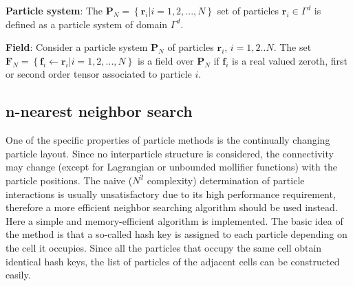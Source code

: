 \documentclass[a4paper,12pt,openany]{book}
\theoremstyle{break}
\begin{document}
\textbf{Particle system}: The $\textbf{P}_{N}=\left\{\textbf{r}_i|i=1,2,...,N\right\}$ set of particles $\textbf{r}_i\in\Gamma^d$ is defined as a particle system of domain $\Gamma^d$.

\textbf{Field}: Consider a particle system $\textbf{P}_N$ of particles $\textbf{r}_i$, $i=1,2..N$. The set $\textbf{F}_N=\left\{\textbf{f}_i\leftarrow \textbf{r}_i \vert i=1,2,...,N\right\}$ is a field over $\textbf{P}_N$ if $\textbf{f}_i$ is a real valued zeroth, first or second order tensor associated to particle $i$.

\subsection{n-nearest neighbor search} \label{sec:neighbor_search}
One of the specific properties of particle methods is the continually changing particle layout. Since no interparticle structure is considered, the connectivity may change (except for Lagrangian or unbounded mollifier functions) with the particle positions. The naive ($N^2$ complexity) determination of particle interactions is usually unsatisfactory due to its high performance requirement, therefore a more efficient neighbor searching algorithm should be used instead. Here a simple and memory-efficient algorithm is implemented. The basic idea of the method is that a so-called hash key is assigned to each particle depending on the cell it occupies. Since all the particles that occupy the same cell obtain identical hash keys, the list of particles of the adjacent cells can be constructed easily.
\end{document}
